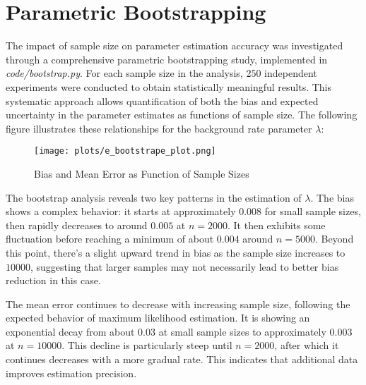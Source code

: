\documentclass[a4paper, 12pt]{article}
\begin{document}
\section{Parametric Bootstrapping}
\hspace{1.5em}The impact of sample size on parameter estimation accuracy was investigated through a comprehensive parametric bootstrapping study, implemented in \textit{code/bootstrap.py}. For each sample size in the analysis, $250$ independent experiments were conducted to obtain statistically meaningful results. This systematic approach allows quantification of both the bias and expected uncertainty in the parameter estimates as functions of sample size. The following figure illustrates these relationships for the background rate parameter $\lambda$:
\begin{figure}[H]
    \centering
    \texttt{[image: plots/e\_bootstrape\_plot.png]}
    \caption{Bias and Mean Error as Function of Sample Sizes}
    \label{fig:enter-label}
\end{figure}
\par The bootstrap analysis reveals two key patterns in the estimation of $\lambda$. The bias shows a complex behavior: it starts at approximately $0.008$ for small sample sizes, then rapidly decreases to around $0.005$ at $n=2000$. It then exhibits some fluctuation before reaching a minimum of about $0.004$ around $n=5000$. Beyond this point, there's a slight upward trend in bias as the sample size increases to $10000$, suggesting that larger samples may not necessarily lead to better bias reduction in this case.

\par The mean error continues to decrease with increasing sample size, following the expected behavior of maximum likelihood estimation. It is showing an exponential decay from about $0.03$ at small sample sizes to approximately $0.003$ at $n=10000$. This decline is particularly steep until $n=2000$, after which it continues decreases with a more gradual rate. This indicates that additional data improves estimation precision.
\end{document}
